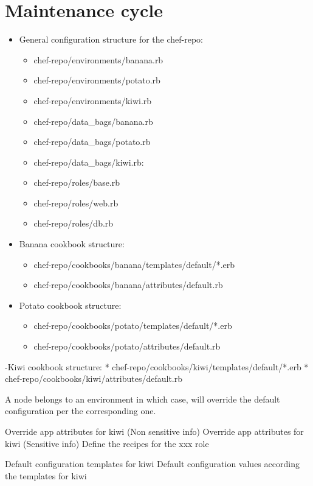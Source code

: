 \chapter{Maintenance cycle}

\begin{itemize}
\item General configuration structure for the chef-repo:


\begin{itemize}
\item chef-repo/environments/banana.rb
\item chef-repo/environments/potato.rb
\item chef-repo/environments/kiwi.rb
\item chef-repo/data\_bags/banana.rb
\item chef-repo/data\_bags/potato.rb
\item chef-repo/data\_bags/kiwi.rb: 
\item chef-repo/roles/base.rb
\item chef-repo/roles/web.rb
\item chef-repo/roles/db.rb
\end{itemize}
\item Banana cookbook structure:


\begin{itemize}
\item chef-repo/cookbooks/banana/templates/default/*.erb
\item chef-repo/cookbooks/banana/attributes/default.rb
\end{itemize}
\item Potato cookbook structure:


\begin{itemize}
\item chef-repo/cookbooks/potato/templates/default/*.erb
\item chef-repo/cookbooks/potato/attributes/default.rb
\end{itemize}
\end{itemize}

-Kiwi cookbook structure:
    * chef-repo/cookbooks/kiwi/templates/default/*.erb
    * chef-repo/cookbooks/kiwi/attributes/default.rb

A node belongs to an environment in which case, will override the default configuration per the corresponding one.

Override app attributes for kiwi (Non sensitive info)
Override app attributes for kiwi (Sensitive info)
Define the recipes for the xxx role

Default configuration templates for kiwi
Default configuration values according the templates for kiwi